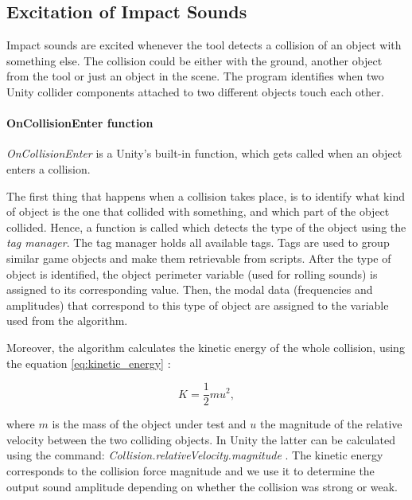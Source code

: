 \subsection{Excitation of Impact Sounds}\label{sec:coll_enter}
Impact sounds are excited whenever the tool detects a collision of an object with something else. The collision could be either with the ground, another object from the tool or just an object in the scene. The program identifies when two Unity\textsuperscript{\textregistered} collider components attached to two different objects touch each other.

\paragraph{OnCollisionEnter function}
\hfill \break

\textit{OnCollisionEnter} \cite{bib:unity_doc} is a Unity\textsuperscript{\textregistered}'s built-in function, which gets called when an object enters a collision.

The first thing that happens when a collision takes place, is to identify what kind of object is the one that collided with something, and which part of the object collided. Hence, a function is called which detects the type of the object using the \textit{tag manager}. The tag manager holds all available tags. Tags are used to group similar game objects and make them retrievable from scripts. After the type of object is identified, the object perimeter variable (used for rolling sounds) is assigned to its corresponding value. Then, the modal data (frequencies and amplitudes) that correspond to this type of object are assigned to the variable used from the algorithm.

Moreover, the algorithm calculates the kinetic energy of the whole collision, using the equation \ref{eq:kinetic_energy} \cite{crowell2003conservation}: 

\begin{equation}\label{eq:kinetic_energy}
K = \frac{1}{2} m u^2,
\end{equation}

\noindent where $m$ is the mass of the object under test and $u$ the magnitude of the relative velocity between the two colliding objects. In Unity\textsuperscript{\textregistered} the latter can be calculated using the command: \textit{Collision.relativeVelocity.magnitude} \cite{bib:unity_doc}. The kinetic energy corresponds to the collision force magnitude and we use it to determine the output sound amplitude depending on whether the collision was strong or weak.

